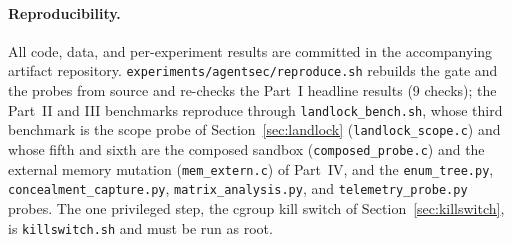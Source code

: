 \documentclass[11pt]{article}
\begin{document}
\paragraph{Reproducibility.} All code, data, and per-experiment results are committed in the
accompanying artifact repository.
\texttt{experiments/agentsec/reproduce.sh} rebuilds
the gate and the probes from source and re-checks the Part~I headline results (9 checks); the Part~II and
III benchmarks reproduce through \texttt{landlock\_bench.sh}, whose third benchmark is the scope probe
of Section~\ref{sec:landlock} (\texttt{landlock\_scope.c}) and whose fifth and sixth are the composed
sandbox (\texttt{composed\_probe.c}) and the external memory mutation (\texttt{mem\_extern.c}) of
Part~IV, and the \texttt{enum\_tree.py},
\texttt{concealment\_capture.py}, \texttt{matrix\_analysis.py}, and \texttt{telemetry\_probe.py} probes.
The one privileged step, the cgroup kill switch of Section~\ref{sec:killswitch}, is \texttt{killswitch.sh}
and must be run as root.
\end{document}
